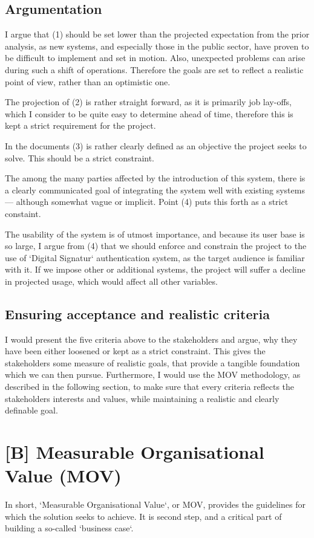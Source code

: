 \documentclass[11pt]{article}
\begin{document}
\subsection{Argumentation}
I argue that (1) should be set lower than the projected expectation from the
prior analysis, as new systems, and especially those in the public sector, have
proven to be difficult to implement and set in motion. Also, unexpected
problems can arise during such a shift of operations. Therefore the goals are
set to reflect a realistic point of view, rather than an optimistic one.

The projection of (2) is rather straight forward, as it is primarily job
lay-offs, which I consider to be quite easy to determine ahead of time,
therefore this is kept a strict requirement for the project.

In the documents (3) is rather clearly defined as an objective the project
seeks to solve. This should be a strict constraint.

The among the many parties affected by the introduction of this system, there
is a clearly communicated goal of integrating the system well with existing
systems --- although somewhat vague or implicit. Point (4) puts this forth as
a strict constaint.

The usability of the system is of utmost importance, and because its user base
is so large, I argue from (4) that we should enforce and constrain the project
to the use of `Digital Signatur` authentication system, as the target audience
is familiar with it. If we impose other or additional systems, the project will
suffer a decline in projected usage, which would affect all other variables.

\subsection{Ensuring acceptance and realistic criteria}
I would present the five criteria above to the stakeholders and argue, why they
have been either loosened or kept as a strict constraint. This gives the
stakeholders some measure of realistic goals, that provide a tangible foundation
which we can then pursue. Furthermore, I would use the MOV methodology, as
described in the following section, to make sure that every criteria reflects
the stakeholders interests and values, while maintaining a realistic and
clearly definable goal.

\section{[B] Measurable Organisational Value (MOV)}
In short, `Measurable Organisational Value`, or MOV, provides the guidelines
for which the solution seeks to achieve. It is second step, and a critical part
of building a so-called `business case`.
\end{document}
